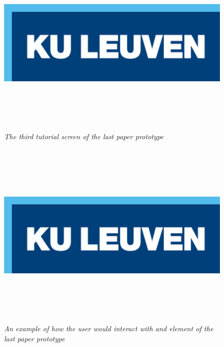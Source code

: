 \begin{figure}[H]
	\begin{center}
		\includegraphics[width=16cm, height=9cm]{KUL.png}
		\caption{\emph{The third tutorial screen of the last paper prototype}}
		\label{The third tutorial screen of the last paper prototype}
	\end{center}
\end{figure}

\begin{figure}[H]
	\begin{center}
		\includegraphics[width=16cm, height=9cm]{KUL.png}
		\caption{\emph{An example of how the user would interact with and element of the last paper prototype}}
		\label{An example of how the user would interact with and element of the last paper prototype}
	\end{center}
\end{figure}

